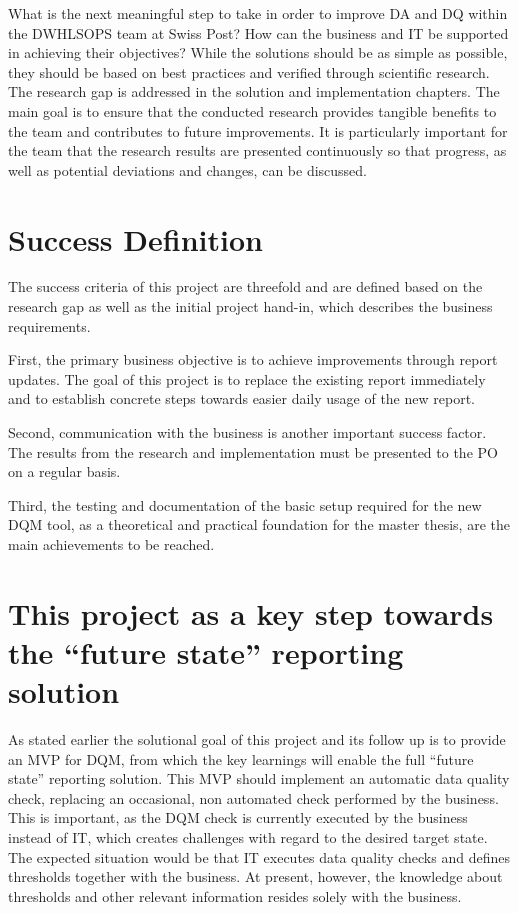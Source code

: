 What is the next meaningful step to take in order to improve \gls{DA} and \gls{DQ} within the \gls{DWHLSOPS} team at Swiss Post? How can the business and IT be supported in achieving their objectives? While the solutions should be as simple as possible, they should be based on best practices and verified through scientific research. The research gap is addressed in the solution and implementation chapters. The main goal is to ensure that the conducted research provides tangible benefits to the team and contributes to future improvements. It is particularly important for the team that the research results are presented continuously so that progress, as well as potential deviations and changes, can be discussed.



\section{Success Definition}
\label{ResearchSuccessDefinition}

The success criteria of this project are threefold and are defined based on the research gap as well as the initial project hand-in, which describes the business requirements.

First, the primary business objective is to achieve improvements through report updates. The goal of this project is to replace the existing report immediately and to establish concrete steps towards easier daily usage of the new report.

Second, communication with the business is another important success factor. The results from the research and implementation must be presented to the \gls{PO} on a regular basis.

Third, the testing and documentation of the basic setup required for the new DQM tool, as a theoretical and practical foundation for the master thesis, are the main achievements to be reached.







\section{This project as a key step towards the “future state” reporting solution}
\label{SolutionIntentedSol}

As stated earlier the solutional goal of this project and its follow up is to provide an MVP for DQM, from which the key learnings will enable the full “future state” reporting solution. This MVP should implement an automatic data quality check, replacing an occasional, non automated check performed by the business. This is important, as the DQM check is currently executed by the business instead of IT, which creates challenges with regard to the desired target state. The expected situation would be that IT executes data quality checks and defines thresholds together with the business. At present, however, the knowledge about thresholds and other relevant information resides solely with the business.

